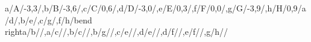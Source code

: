 \begin{compatibilitygraph}{a/A/{-3,3}/,b/B/{-3,6}/,c/C/{0,6}/,d/D/{-3,0}/,e/E/{0,3}/,f/F/{0,0}/,g/G/{-3,9}/,h/H/{0,9}/}{a/d/,b/e/,c/g/,f/h/bend right}{a/b//,a/c//,b/c//,b/g//,c/e//,d/e//,d/f//,e/f//,g/h//}{}{}
\end{compatibilitygraph}